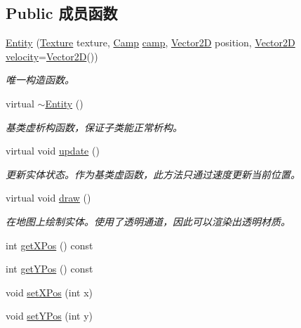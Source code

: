 \subsection*{Public 成员函数}
\begin{DoxyCompactItemize}
\item 
\hyperlink{class_entity_a604327e36e9783d29dd6ae6e4626777a}{Entity} (\hyperlink{struct_texture}{Texture} texture, \hyperlink{_entity_8h_ad54c4fe39f1c51b786c24ae0b7763b44}{Camp} \hyperlink{class_entity_a5326accd49d3817310ec90692b9da3df}{camp}, \hyperlink{_vector2_d_8hpp_aa1f1145650f1dd9bddf7335ec6434d7c}{Vector2D} position, \hyperlink{_vector2_d_8hpp_aa1f1145650f1dd9bddf7335ec6434d7c}{Vector2D} \hyperlink{class_entity_a386d25b56772b8913eb3e5adc636f6e0}{velocity}=\hyperlink{_vector2_d_8hpp_aa1f1145650f1dd9bddf7335ec6434d7c}{Vector2D}())
\begin{DoxyCompactList}\small\item\em 唯一构造函数。 \end{DoxyCompactList}\item 
virtual \hyperlink{class_entity_a588098978eea6a3486b7361605ff3f0f}{$\sim$\+Entity} ()
\begin{DoxyCompactList}\small\item\em 基类虚析构函数，保证子类能正常析构。 \end{DoxyCompactList}\item 
virtual void \hyperlink{class_entity_a00b6eeaf99b35c8f8b10b5fbfc1baf4f}{update} ()
\begin{DoxyCompactList}\small\item\em 更新实体状态。作为基类虚函数，此方法只通过速度更新当前位置。 \end{DoxyCompactList}\item 
virtual void \hyperlink{class_entity_a7666f416dd0d1fce0f1133f78df44476}{draw} ()
\begin{DoxyCompactList}\small\item\em 在地图上绘制实体。使用了透明通道，因此可以渲染出透明材质。 \end{DoxyCompactList}\item 
int \hyperlink{class_entity_ac704e83937d21eb280bf0618c27e2e66}{get\+X\+Pos} () const
\item 
int \hyperlink{class_entity_a8dc5891871faff09d565738104e1d42f}{get\+Y\+Pos} () const
\item 
void \hyperlink{class_entity_a8afb8aa252cbbffecc2dff0669cb2896}{set\+X\+Pos} (int x)
\item 
void \hyperlink{class_entity_a66278a362d97e2a30912c2a31962bfb9}{set\+Y\+Pos} (int y)

\end{DoxyCompactItemize}
